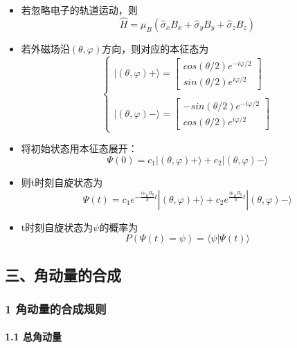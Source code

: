 \documentclass[UTF8,twocolumn]{ctexart}
\providecommand{\tightlist}{%
  \setlength{\itemsep}{0pt}\setlength{\parskip}{0pt}}
\let\oldparagraph\paragraph
\renewcommand{\paragraph}[1]{\oldparagraph{#1}\mbox{}}
\begin{document}
\begin{itemize}
\tightlist
\item
  若忽略电子的轨道运动，则
  \[\hat{H}=\mu_B(\hat{\sigma}_xB_x+\hat{\sigma}_yB_y+\hat{\sigma}_zB_z)\]
\item
  若外磁场沿\((\theta,\varphi)\)方向，则对应的本征态为 \[\begin{cases}
    |(\theta,\varphi)+\rangle=
    \left[\begin{matrix}
        cos(\theta/2)e^{-i\varphi/2} \\
        sin(\theta/2)e^{i\varphi/2}
    \end{matrix}\right]\\\\
    |(\theta,\varphi)-\rangle=
    \left[\begin{matrix}
        -sin(\theta/2)e^{-i\varphi/2} \\
        cos(\theta/2)e^{i\varphi/2}
    \end{matrix}\right]
  \end{cases}\]
\item
  将初始状态用本征态展开：
  \[\Psi(0)=c_1|(\theta,\varphi)+\rangle+c_2|(\theta,\varphi)-\rangle\]
\item
  则t时刻自旋状态为
  \[\Psi(t)=c_1e^{-\frac{i\mu_BB_0}{\hbar}t}|(\theta,\varphi)+\rangle+c_2e^{\frac{i\mu_BB_0}{\hbar}t}|(\theta,\varphi)-\rangle\]
\item
  t时刻自旋状态为\(\psi\)的概率为
  \[P(\Psi(t)=\psi)=\langle\psi|\Psi(t)\rangle\]
\end{itemize}

\hypertarget{ux4e09ux89d2ux52a8ux91cfux7684ux5408ux6210}{%
\subsection{三、角动量的合成}\label{ux4e09ux89d2ux52a8ux91cfux7684ux5408ux6210}}

\hypertarget{ux89d2ux52a8ux91cfux7684ux5408ux6210ux89c4ux5219}{%
\subsubsection{1
角动量的合成规则}\label{ux89d2ux52a8ux91cfux7684ux5408ux6210ux89c4ux5219}}

\hypertarget{ux603bux89d2ux52a8ux91cf}{%
\paragraph{ 1.1 总角动量}\label{ux603bux89d2ux52a8ux91cf}}
\end{document}
